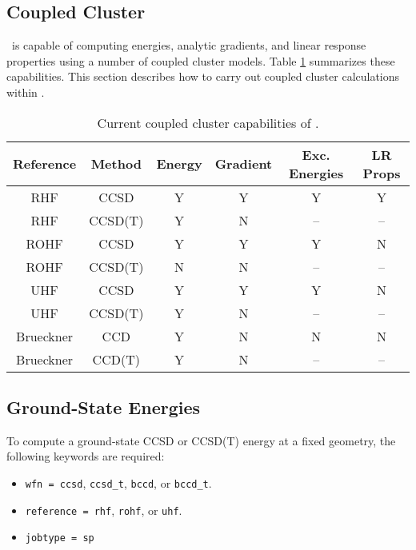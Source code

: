 \subsection{Coupled Cluster} \label{cc}
\PSIthree\ is capable of computing energies, analytic gradients, and
linear response properties using a number of coupled cluster models.
Table \ref{table:ccsummary} summarizes these capabilities.  This
section describes how to carry out coupled cluster calculations within
\PSIthree.
\begin{table}
\begin{center}
\begin{tabular}{cccccc}
\hline
\hline
Reference & Method & Energy    & Gradient  &  Exc. Energies & LR Props \\
\hline
RHF       & CCSD    & Y & Y & Y & Y  \\
RHF       & CCSD(T) & Y & N & --& -- \\
ROHF      & CCSD    & Y & Y & Y & N  \\
ROHF      & CCSD(T) & N & N & --& -- \\
UHF       & CCSD    & Y & Y & Y & N  \\
UHF       & CCSD(T) & Y & N & --& -- \\
Brueckner & CCD     & Y & N & N & N  \\
Brueckner & CCD(T)  & Y & N & --& -- \\
\hline
\hline
\end{tabular}
\end{center}
\caption{Current coupled cluster capabilities of \PSIthree.}
\label{table:ccsummary}
\end{table}

\subsection{Ground-State Energies}

To compute a ground-state CCSD or CCSD(T) energy at a fixed geometry,
the following keywords are required:
\begin{itemize}
\item {\tt wfn = ccsd}, {\tt ccsd\_t}, {\tt bccd}, or {\tt bccd\_t}.
\item {\tt reference = rhf}, {\tt rohf}, or {\tt uhf}.
\item {\tt jobtype = sp}
\end{itemize}

